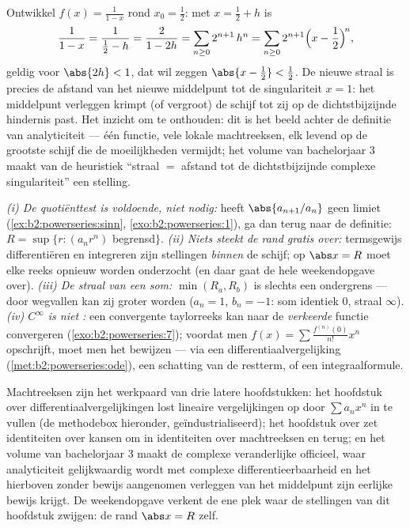 \begin{example}\label{ex:b2:powerseries:recenter}
Ontwikkel $f(x) = \frac{1}{1-x}$ rond $x_0 = \frac12$: met $x =
\frac12 + h$ is
\[
\frac{1}{1 - x} = \frac{1}{\frac12 - h}
= \frac{2}{1 - 2h}
= \sum_{n\geq0} 2^{n+1}\,h^n
= \sum_{n\geq0} 2^{n+1}\Bigl(x - \frac12\Bigr)^{\!n},
\]
geldig voor $\abs{2h} < 1$, dat wil zeggen $\abs{x - \frac12} <
\frac12$. De nieuwe straal is precies de afstand van het nieuwe
middelpunt tot de singulariteit $x = 1$: het middelpunt verleggen
krimpt (of vergroot) de schijf tot zij op de dichtstbijzijnde
hindernis past. Het inzicht om te onthouden: dit is het beeld
achter de definitie van analyticiteit --- één functie, vele lokale
machtreeksen, elk levend op de grootste schijf die de moeilijkheden
vermijdt; het volume van bachelorjaar 3 maakt van de heuristiek
``straal $=$ afstand tot de dichtstbijzijnde complexe
singulariteit'' een stelling.
\end{example}

\begin{remark}
\emph{(i) De quotiënttest is voldoende, niet nodig:} heeft
$\abs{a_{n+1}/a_n}$ geen limiet
(\cref{ex:b2:powerseries:sinn}, \cref{exo:b2:powerseries:1}), ga
dan terug naar de definitie: $R = \sup\{r : (a_nr^n)$ begrensd$\}$.
\emph{(ii) Niets steekt de rand gratis over:} termsgewijs
differentiëren en integreren zijn stellingen \emph{binnen} de 
schijf; op $\abs x = R$ moet elke reeks opnieuw worden onderzocht
(en daar gaat de hele weekendopgave over). \emph{(iii) De straal
van een som:} $\min(R_a, R_b)$ is slechts een ondergrens --- door
wegvallen kan zij groter worden ($a_n = 1$, $b_n = -1$: som identiek
$0$, straal $\infty$). \emph{(iv) $C^\infty$ is niet :}
een convergente taylorreeks kan naar de \emph{verkeerde} functie
convergeren (\cref{exo:b2:powerseries:7}); voordat men $f(x) = \sum
\frac{f^{(n)}(0)}{n!}x^n$ opschrijft, moet men het bewijzen --- via
een differentiaalvergelijking (\cref{met:b2:powerseries:ode}), een
schatting van de restterm, of een integraalformule.
\end{remark}

\begin{remark}
Machtreeksen zijn het werkpaard van drie latere hoofdstukken: het
hoofdstuk over differentiaalvergelijkingen lost lineaire
vergelijkingen op door $\sum a_nx^n$ in te vullen (de methodebox
hieronder, geïndustrialiseerd); het hoofdstuk over  zet identiteiten over kansen om in identiteiten over
machtreeksen en terug; en het volume van bachelorjaar 3 maakt de
complexe veranderlijke officieel, waar analyticiteit gelijkwaardig
wordt met complexe differentieerbaarheid en het hierboven zonder
bewijs aangenomen verleggen van het middelpunt zijn eerlijke bewijs
krijgt. De weekendopgave verkent de ene plek waar de stellingen van
dit hoofdstuk zwijgen: de rand $\abs x = R$ zelf.
\end{remark}


